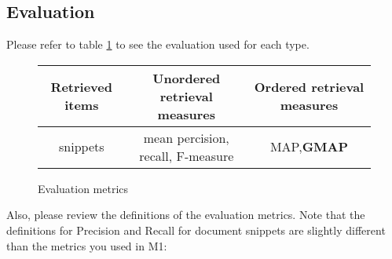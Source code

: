 \subsection{Evaluation}
Please refer to table \ref{fig:eval} to see the evaluation used for each type.
\begin{figure}[h!]
\begin{tabular}{|c|c|c|}
\hline
	\textbf{Retrieved items} & \textbf{Unordered retrieval measures} & \textbf{Ordered retrieval measures}\\ \hline
	snippets & mean percision, recall, F-measure & MAP,\textbf{GMAP}\\ \hline
\end{tabular}
\label{fig:eval}
\caption{Evaluation metrics}
\end{figure}

Also, please review the definitions of the evaluation metrics. Note that the definitions for Precision and Recall for document snippets are slightly different than the metrics you used in M1:

